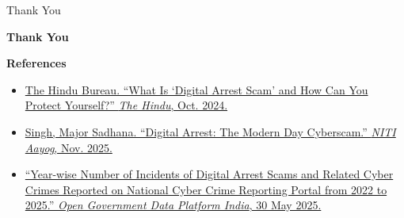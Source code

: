 \documentclass{beamer}
\begin{document}
\begin{frame}{Thank You}

\centering
\vspace{0.3cm}

{\Huge \textbf{Thank You}}

\vspace{0.6cm}

\small
\textbf{References}

\vspace{0.2cm}

\begin{itemize}

  \item \href{https://www.thehindu.com/news/national/digital-arrest-scam-how-to-protect-yourself/article68806494.ece}
  {The Hindu Bureau. “What Is ‘Digital Arrest Scam’ and How Can You Protect Yourself?” 
  \textit{The Hindu}, Oct. 2024.}

  \item \href{https://www.niti.gov.in/sites/default/files/2025-04/Digital_Arrest_The_Modern_Day_Cyber_Scam.pdf}
  {Singh, Major Sadhana. “Digital Arrest: The Modern Day Cyberscam.” 
  \textit{NITI Aayog}, Nov. 2025.}

  \item \href{https://www.data.gov.in/resource/year-wise-number-incidents-digital-arrest-scams-and-related-cyber-crimes-reported-national}
  {“Year-wise Number of Incidents of Digital Arrest Scams and Related Cyber Crimes Reported on National Cyber Crime Reporting Portal from 2022 to 2025.” 
  \textit{Open Government Data Platform India}, 30 May 2025.}

\end{itemize}

\end{frame}
\end{document}
